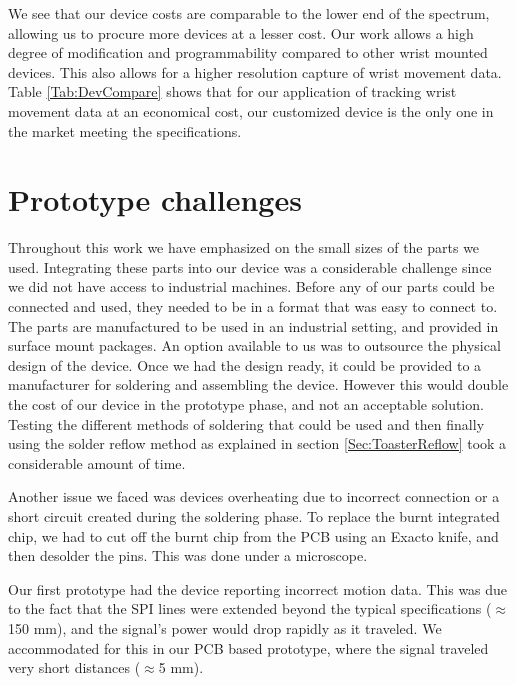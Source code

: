 We see that our device costs are comparable to the lower end of the spectrum,
allowing us to procure more devices at a lesser cost.
Our work allows a high degree of modification and programmability compared to other
wrist mounted devices.
This also allows for a higher resolution capture of wrist movement data.
Table \ref{Tab:DevCompare} shows that for our application of tracking wrist movement data at an economical cost,
our customized device is the only one in the market meeting the specifications.

\section{Prototype challenges}
\label{Sec:ProtoChall}
Throughout this work we have emphasized on the small sizes of the parts we used.
Integrating these parts into our device was a considerable challenge since we did not have access to industrial machines.
Before any of our parts could be connected and used,
they needed to be in a format that was easy to connect to.
The parts are manufactured to be used in an industrial setting,
and provided in surface mount packages.
An option available to us was to outsource the physical design of the device.
Once we had the design ready,
it could be provided to a manufacturer for soldering and assembling the device.
However this would double the cost of our device in the prototype phase, 
and not an acceptable solution.
Testing the different methods of soldering that could be used and then finally using
the solder reflow method as explained in section \ref{Sec:ToasterReflow}
took a considerable amount of time.

Another issue we faced was devices overheating due to incorrect connection or a short circuit
created during the soldering phase.
To replace the burnt integrated chip,
we had to cut off the burnt chip from the PCB using an Exacto knife,
and then desolder the pins. This was done under a microscope.

Our first prototype had the device reporting incorrect motion data.
This was due to the fact that the SPI lines were extended beyond the typical specifications ($\approx$150 mm),
and the signal's power would drop rapidly as it traveled.
We accommodated for this in our PCB based prototype,
where the signal traveled very short distances ($\approx$5 mm).

